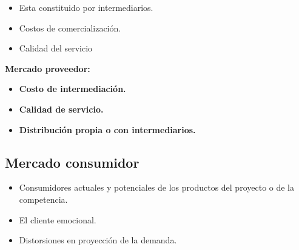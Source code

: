 \documentclass{templateNote}
\begin{document}
\begin{itemize}
    \item Esta constituido por intermediarios.
    \item Costos de comercialización.
    \item Calidad del servicio
\end{itemize}

\textbf{Mercado proveedor:}
\begin{itemize}
    \item \textbf{Costo de intermediación.}
    \item \textbf{Calidad de servicio.}
    \item \textbf{Distribución propia o con intermediarios.}
\end{itemize}

\subsection{Mercado consumidor}
\begin{itemize}
    \item Consumidores actuales y potenciales de los productos del proyecto o de la competencia.
    \item El cliente emocional.
    \item Distorsiones en proyección de la demanda.
\end{itemize}
\end{document}
